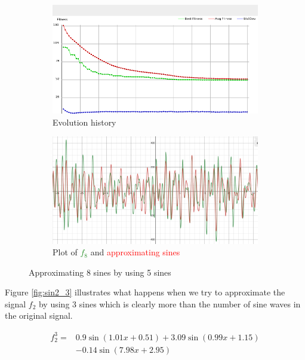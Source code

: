 \documentclass[conference]{IEEEtran}
\begin{document}
\begin{figure}[h]
\centering
\begin{subfigure}{.8\linewidth}
  \centering
  \includegraphics[width=.9\linewidth]{img/sin8_5.png}
  \caption{Evolution history}
  \label{fig:hist_sin8_5}
\end{subfigure}

\begin{subfigure}{.8\linewidth}
  \centering
  \includegraphics[width=.9\linewidth]{img/plot_sin8_5.png}
  \caption{Plot of \textcolor{ForestGreen}{$f_8$} and \textcolor{red}{approximating sines}}
  \label{fig:plot_sin8_5}
\end{subfigure}
\caption{Approximating 8 sines by using 5 sines}
\label{fig:sin8_5}
\end{figure}

Figure \ref{fig:sin2_3} illustrates what happens when we try to approximate the signal $f_2$ by using 3 sines which is clearly more than the number of sine waves in the original signal.

\begin{equation}
	\begin{split}
		f_2^3 =& 0.9\sin(1.01x+0.51) + 3.09\sin(0.99x+1.15) \\
		&- 0.14\sin(7.98x+2.95)
	\end{split}
	\label{eq:f2_3}
\end{equation}
\end{document}
